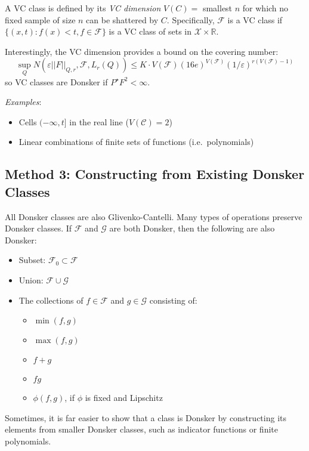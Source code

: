 \documentclass[
]{article}
\providecommand{\tightlist}{%
  \setlength{\itemsep}{0pt}\setlength{\parskip}{0pt}}
\begin{document}
A VC class is defined by its \emph{VC dimension} \(V(C) =\) smallest
\(n\) for which no fixed sample of size \(n\) can be shattered by \(C\).
Specifically, \(\mathcal{F}\) is a VC class if
\(\{(x,t) : f(x) < t, f \in \mathcal{F}\}\) is a VC class of sets in
\(\mathcal{X} \times \mathbb{R}\).

Interestingly, the VC dimension provides a bound on the covering number:
\[\sup_{Q}N(\varepsilon||F||_{Q,r}, \mathcal{F}, L_r(Q)) \leq K\cdot V(\mathcal{F})(16e)^{V(\mathcal{F})}(1/\varepsilon)^{r(V(\mathcal{F}) - 1)}\]
so VC classes are Donsker if \(P^\star F^2 < \infty\).

\emph{Examples}: 
\begin{itemize}
	\item Cells \((-\infty, t]\) in the real line
	(\(V(\mathcal{C}) = 2\))
	\item Linear combinations of finite sets of
	functions (i.e.~polynomials)
\end{itemize} 

\subsection{Method 3: Constructing from Existing
Donsker Classes}

All Donsker classes are also Glivenko-Cantelli. Many
types of operations preserve Donsker classes. If \(\mathcal{F}\) and
\(\mathcal{G}\) are both Donsker, then the following are also Donsker:

\begin{itemize}
\tightlist
\item
  Subset: \(\mathcal{F}_0 \subset \mathcal{F}\)
\item
  Union: \(\mathcal{F} \cup \mathcal{G}\)
\item
  The collections of \(f \in \mathcal{F}\) and \(g \in \mathcal{G}\)
  consisting of:

  \begin{itemize}
  \tightlist
  \item
    \(\min(f, g)\)
  \item
    \(\max(f, g)\)
  \item
    \(f + g\)
  \item
    \(fg\)
  \item
    \(\phi(f,g)\), if \(\phi\) is fixed and Lipschitz
  \end{itemize}
\end{itemize}

Sometimes, it is far easier to show that a class is Donsker by
constructing its elements from smaller Donsker classes, such as
indicator functions or finite polynomials. 
\end{document}
